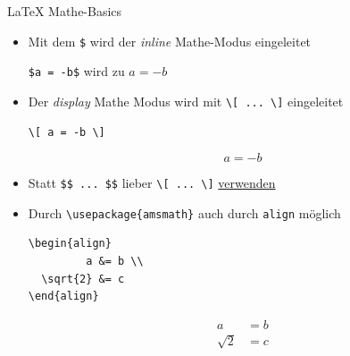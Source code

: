 \documentclass[main.tex]{subfiles}
\begin{document}
\begin{frame}[fragile]{\LaTeX{} Mathe-Basics}
	\begin{itemize}
		\item Mit dem \texttt{\$} wird der \textit{inline} Mathe-Modus eingeleitet
		      \pause
		      \begin{center}
			      \verb|$a = -b$| wird zu $a=-b$
		      \end{center}
		      \pause
		\item Der \textit{display} Mathe Modus wird mit \verb|\[ ... \]| eingeleitet
		      \vspace{-7pt}
		      \begin{center}
			      \begin{minipage}[t][][b]{0.35\textwidth}
				      \begin{verbatim}
\[ a = -b \]
                \end{verbatim}
			      \end{minipage}
			      \begin{minipage}[t][][b]{0.35\textwidth}
				      \vspace{-9pt}\[a = -b\]
			      \end{minipage}
		      \end{center}
		      \vspace{-7pt}
		      \pause
		\item Statt \verb|$$ ... $$| lieber \verb|\[ ... \]| \href{https://tex.stackexchange.com/a/69854}{verwenden}
		      \pause
		      \medskip
		\item Durch \verb|\usepackage{amsmath}| auch durch \texttt{align} möglich
		      \pause
		      \vspace{-7pt}
		      \begin{center}
			      \begin{minipage}[t][][b]{0.35\textwidth}
				      \begin{verbatim}
\begin{align}
         a &= b \\
  \sqrt{2} &= c
\end{align}
                \end{verbatim}
			      \end{minipage}
			      \begin{minipage}[t][][b]{0.35\textwidth}
				      \vspace{-6pt}
				      \begin{align}
					      a        & = b \\
					      \sqrt{2} & = c
				      \end{align}
			      \end{minipage}
		      \end{center}
		      \vspace{-7pt}
	\end{itemize}
\end{frame}
\end{document}
